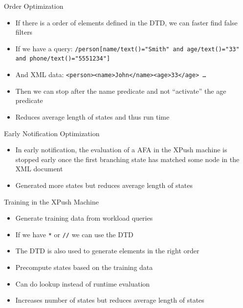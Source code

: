 \documentclass[mathserif,serif]{beamer}
\begin{document}
\begin{frame}{Order Optimization}
  \begin{itemize}
    \item If there is a order of elements defined in the DTD, we can faster find false filters
    \item If we have a query: \texttt{/person[name/text()="Smith" and age/text()="33" and phone/text()="5551234"]}
    \item And XML data: \texttt{<person><name>John</name><age>33</age> \dots}
    \item Then we can stop after the name predicate and not ``activate'' the age predicate
    \item Reduces average length of states and thus run time 
  \end{itemize}
\end{frame}

\begin{frame}{Early Notification Optimization}
  \begin{itemize}
    \item In early notification, the evaluation of a AFA in the XPush machine is stopped early once the first branching state has matched some node in the XML document
    \item Generated more states but reduces average length of states
  \end{itemize}
\end{frame}

\begin{frame}{Training in the XPush Machine}
  \begin{itemize}
    \item Generate training data from workload queries
    \item If we have \texttt{*} or \texttt{//} we can use the DTD
    \item The DTD is also used to generate elements in the right order
    \item Precompute states based on the training data
    \item Can do lookup instead of runtime evaluation 
    \item Increases number of states but reduces average length of states
  \end{itemize}
\end{frame}
\end{document}
